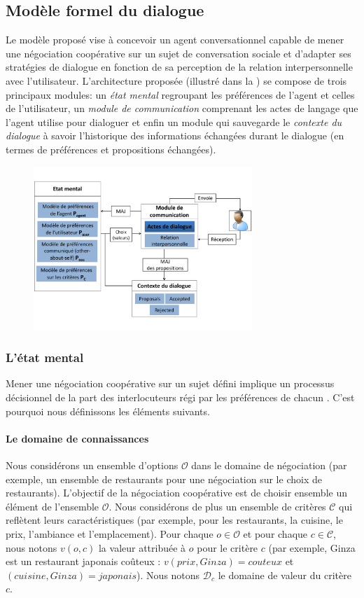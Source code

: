 \documentclass [french]{sig-alternate-05-2015}
\begin{document}
\subsection{Modèle formel du dialogue}
\par Le modèle proposé vise à concevoir un agent conversationnel capable de mener une négociation coopérative sur un sujet de conversation sociale et d'adapter ses stratégies de dialogue en fonction de sa perception de la relation interpersonnelle avec l'utilisateur. L'architecture proposée (illustré dans
 la ) se compose de trois principaux modules: un \textit{état mental} regroupant les préférences de l'agent et celles de l'utilisateur, un \textit{module de communication} comprenant les actes de langage que l'agent utilise pour dialoguer et enfin un module qui sauvegarde le \textit{contexte du dialogue} à savoir l'historique des informations échangées durant le dialogue (en termes de préférences et propositions échangées).
\begin{figure}
	\centerline{\includegraphics [width=3.25in]{figs/modele_v1.pdf}}
\end{figure}

\subsubsection{L'état mental}

Mener une négociation coopérative sur un sujet défini implique un processus décisionnel de la part des interlocuteurs régi par les préférences de chacun \cite{laver1981linguistic}. C'est pourquoi nous définissons les éléments suivants.

\paragraph{Le domaine de connaissances}
Nous considérons un ensemble d'options $\mathcal{O}$ dans le domaine de négociation (par exemple, un ensemble de restaurants pour une négociation sur le choix de restaurants). L'objectif de la négociation coopérative est de choisir ensemble un élément de l'ensemble $\mathcal{O}$. Nous considérons de plus un ensemble de critères $\mathcal{C}$ qui reflètent leurs caractéristiques (par exemple, pour les restaurants, la cuisine, le prix, l'ambiance et l'emplacement). Pour chaque $o\in\mathcal{O}$ et pour chaque $c\in\mathcal{C}$, nous notons $v(o,c)$ la valeur attribuée à $o$ pour le critère $c$ (par exemple, Ginza est un restaurant japonais coûteux : $v(prix, Ginza) = couteux $ et $(cuisine, Ginza) = japonais$). Nous notons $\mathcal{D}_c$ le domaine de valeur du critère $c$.
\end{document}
